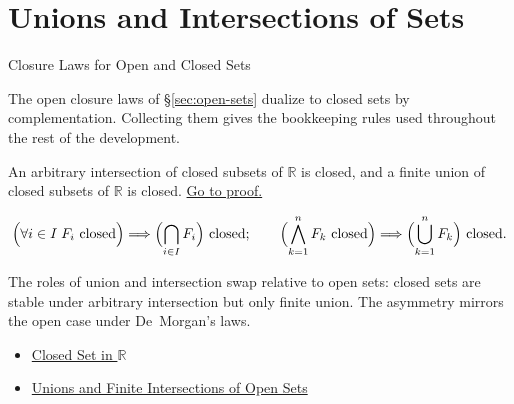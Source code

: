 \section{Unions and Intersections of Sets}
\label{sec:unions-and-intersections}

\begin{topicbox}{Closure Laws for Open and Closed Sets}
\begin{exposition}
The open closure laws of \S\ref{sec:open-sets} dualize to closed sets by complementation. Collecting them gives the bookkeeping rules used throughout the rest of the development.
\end{exposition}
\end{topicbox}
\begin{tcolorbox}[colback=thmbox, colframe=thmborder, arc=2pt,
  left=6pt, right=6pt, top=4pt, bottom=4pt,
  title={\small\textbf{Theorem (Closure Laws for Closed Sets)}},
  fonttitle=\small\bfseries]
\begin{theorem}
\label{thm:closed-set-closure-operations}
An arbitrary intersection of closed subsets of $\mathbb{R}$ is closed, and a finite union of closed subsets of $\mathbb{R}$ is closed.
\hyperref[prf:closed-set-closure-operations]{Go to proof.}
\end{theorem}
\end{tcolorbox}
\begin{remark*}
\[
\Bigl(\forall i\in I\;F_i\text{ closed}\Bigr)\Longrightarrow \Bigl(\bigcap_{i\in I} F_{i}\Bigr) \text{ closed};\qquad
\Bigl(\bigwedge_{k=1}^{n} F_k\text{ closed}\Bigr)\Longrightarrow \Bigl(\bigcup_{k=1}^{n} F_{k}\Bigr) \text{ closed}.
\]
\end{remark*}
\begin{remark*}[Interpretation]
The roles of union and intersection swap relative to open sets: closed sets are stable under arbitrary intersection but only finite union. The asymmetry mirrors the open case under De~Morgan's laws.
\end{remark*}
\begin{dependencies}
\begin{itemize}
  \item \hyperref[def:closed-set]{Closed Set in $\mathbb{R}$}
  \item \hyperref[thm:open-set-closure-operations]{Unions and Finite Intersections of Open Sets}
\end{itemize}
\end{dependencies}
